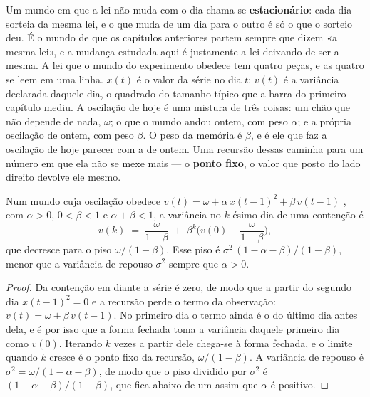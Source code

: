 Um mundo em que a lei não muda com o dia chama-se \textbf{estacionário}: cada dia sorteia da mesma
lei, e o que muda de um dia para o outro é só o que o sorteio deu. É o mundo de que os capítulos
anteriores partem sempre que dizem «a mesma lei», e a mudança estudada aqui é justamente a lei
deixando de ser a mesma.
A lei que o mundo do experimento obedece tem quatro peças, e as quatro se leem em uma linha.
$x(t)$ é o valor da série no dia $t$; $v(t)$ é a variância declarada daquele dia, o quadrado do
tamanho típico que a barra do primeiro capítulo mediu. A oscilação de hoje é uma mistura de três
coisas: um chão que não depende de nada, $\omega$; o que o mundo andou ontem, com peso $\alpha$;
e a própria oscilação de ontem, com peso $\beta$. O peso da memória é $\beta$, e é ele que faz a
oscilação de hoje parecer com a de ontem. Uma recursão dessas caminha para um número em que ela
não se mexe mais --- o \textbf{ponto fixo}, o valor que posto do lado direito devolve ele mesmo.

\begin{proposicao}\label{prop:piso-contencao}
Num mundo cuja oscilação obedece $v(t) = \omega + \alpha\, x(t-1)^2 + \beta\, v(t-1)$
\cite{bollerslev1986generalized}, com $\alpha > 0$, $0 < \beta < 1$ e $\alpha+\beta < 1$, a variância no $k$-ésimo dia de uma contenção é
\[
v(k) \;=\; \frac{\omega}{1-\beta} \;+\; \beta^{k}\Big( v(0) - \frac{\omega}{1-\beta} \Big),
\]
que decresce para o piso $\omega/(1-\beta)$. Esse piso é $\sigma^{2}\,(1-\alpha-\beta)/(1-\beta)$,
menor que a variância de repouso $\sigma^{2}$ sempre que $\alpha > 0$.
\end{proposicao}

\begin{proof}
Da contenção em diante a série é zero, de modo que a partir do segundo dia $x(t-1)^2 = 0$ e a
recursão perde o termo da observação: $v(t) = \omega + \beta\, v(t-1)$. No primeiro dia o termo
ainda é o do último dia antes dela, e é por isso que a forma fechada toma a variância daquele
primeiro dia como $v(0)$. Iterando $k$ vezes a partir dele chega-se à forma fechada, e o limite quando $k$ cresce é o ponto fixo da recursão, $\omega/(1-\beta)$. A
variância de repouso é $\sigma^{2} = \omega/(1-\alpha-\beta)$, de modo que o piso dividido por
$\sigma^{2}$ é $(1-\alpha-\beta)/(1-\beta)$, que fica abaixo de um assim que $\alpha$ é positivo.
\end{proof}

